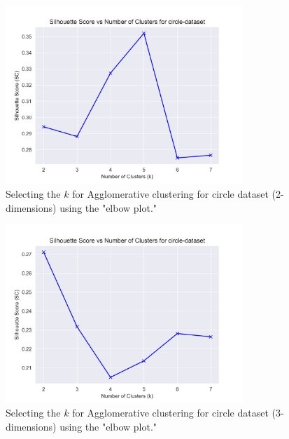\begin{figure}[H]
  \includegraphics[width=0.8\textwidth]{Appendix/parameter-selection/circle-dataset_agglomerative_optimal_cluster_2.png}
  \caption{Selecting the $k$ for Agglomerative clustering for circle dataset (2-dimensions) using the "elbow plot."}
  \label{hyperparameters:agglomerative-circle-dataset-2d}
\end{figure}
\begin{figure}[H]
  \includegraphics[width=0.8\textwidth]{Appendix/parameter-selection/circle-dataset_agglomerative_optimal_cluster_3.png}
  \caption{Selecting the $k$ for Agglomerative clustering for circle dataset (3-dimensions) using the "elbow plot."}
  \label{hyperparameters:agglomerative-circle-dataset-3d}
\end{figure}
\newpage

